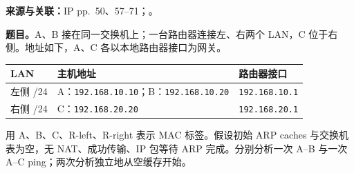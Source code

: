 
\textbf{来源与关联：}IP pp.~50、57--71；。

\textbf{题目。}A、B 接在同一交换机上；一台路由器连接左、右两个 LAN，C 位于右侧。地址如下，A、C 各以本地路由器接口为网关。
\begin{center}
\small
\begin{tabular}{@{}lll@{}}
\toprule
LAN & 主机地址 & 路由器接口 \\
\midrule
左侧 /24 & A：\texttt{192.168.10.10}；B：\texttt{192.168.10.20} & \texttt{192.168.10.1} \\
右侧 /24 & C：\texttt{192.168.20.20} & \texttt{192.168.20.1} \\
\bottomrule
\end{tabular}
\end{center}
用 A、B、C、R-left、R-right 表示 MAC 标签。假设初始 ARP caches 与交换机表为空，无 NAT、成功传输、IP 包等待 ARP 完成。分别分析一次 A--B 与一次 A--C ping；两次分析独立地从空缓存开始。


